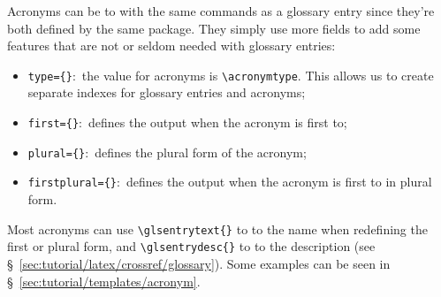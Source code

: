Acronyms can be  to with the same \glspl{command} as a glossary entry since they're both defined by the same \gls{package}. They simply use more fields to add some features that are not or seldom needed with glossary entries:
\begin{itemize}
    \item \texttt{type=\{\}}:~the \gls{value} for acronyms is \verb"\acronymtype". This allows us to create separate indexes for glossary entries and acronyms;
    \item \texttt{first=\{\}}:~defines the output when the acronym is first  to;
    \item \texttt{plural=\{\}}:~defines the plural form of the acronym;
    \item \texttt{firstplural=\{\}}:~defines the output when the acronym is first  to in plural form.
\end{itemize}

Most acronyms can use \texttt{\textbackslash{}glsentrytext\{\}} to  to the name when redefining the first or plural form, and \texttt{\textbackslash{}glsentrydesc\{\}} to  to the description (see \S{}~\ref{sec:tutorial/latex/crossref/glossary}). Some examples can be seen in \S~\ref{sec:tutorial/templates/acronym}.